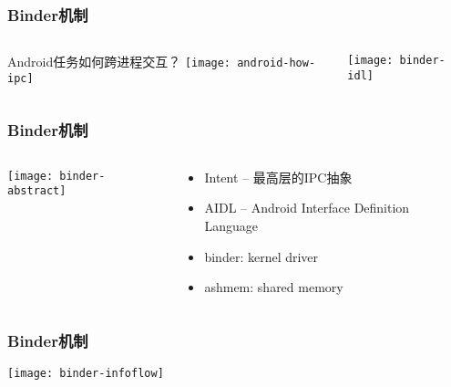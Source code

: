\begin{frame}[fragile]
	\frametitle{Binder机制}
	
	\begin{columns}
		\begin{column}{.5\textwidth}
			Android任务如何跨进程交互？
			\texttt{[image: android-how-ipc]}
			
		\end{column}
		\begin{column}{.5\textwidth}
			
			\texttt{[image: binder-idl]}
			
		\end{column}
	\end{columns}
\end{frame}

\begin{frame}[fragile]
	\frametitle{Binder机制}
	
	\begin{columns}
		\begin{column}{.5\textwidth}
			\texttt{[image: binder-abstract]}
			
		\end{column}
		\begin{column}{.5\textwidth}
			
				\begin{itemize}
		\item Intent -- 最高层的IPC抽象
		\item AIDL -- Android Interface Definition Language
		\item binder: kernel driver
		\item ashmem: shared memory
		\end{itemize}
			
		\end{column}
	\end{columns}
\end{frame}

\begin{frame}[plain]
	\frametitle{Binder机制}
	\centering
	\texttt{[image: binder-infoflow]}
	
\end{frame}

